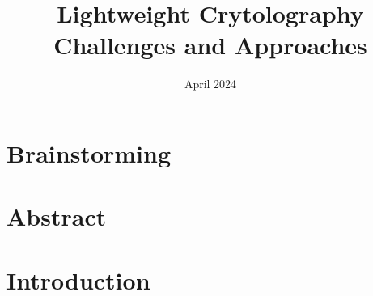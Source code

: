 \documentclass{article}
\title{Lightweight Crytolography Challenges and Approaches}
\author{}
\date{April 2024}
\begin{document}
\maketitle
\section{Brainstorming} %
\section{Abstract} %
\section{Introduction} %
\end{document}

